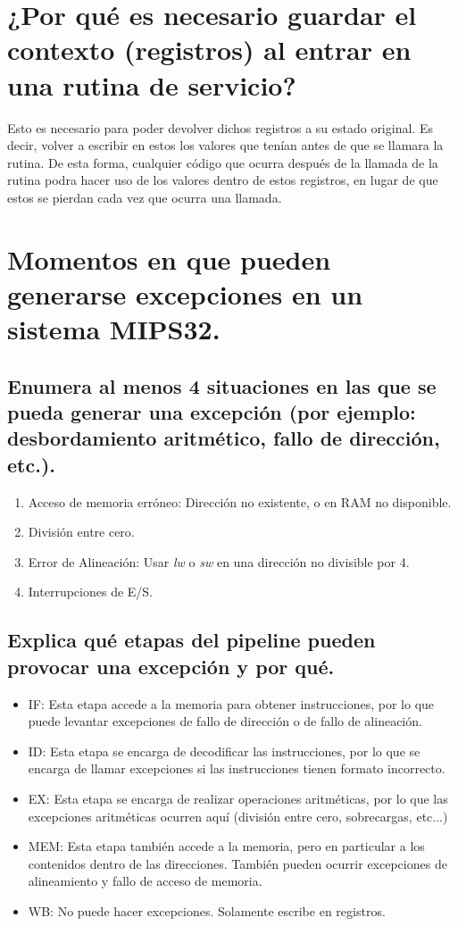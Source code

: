 \documentclass[titlepage]{article}
\begin{document}
\section*{¿Por qué es necesario guardar el contexto (registros) al entrar en una rutina de servicio?}

Esto es necesario para poder devolver dichos registros a su estado original. Es decir, volver a escribir en estos los valores que tenían antes de que se llamara la rutina. De esta forma, cualquier código que ocurra después de la llamada de la rutina podra hacer uso de los valores dentro de estos registros, en lugar de que estos se pierdan cada vez que ocurra una llamada.

\section*{Momentos en que pueden generarse excepciones en un sistema MIPS32.}

\subsection*{Enumera al menos 4 situaciones en las que se pueda generar una excepción (por ejemplo: desbordamiento aritmético, fallo de dirección, etc.).}

\begin{enumerate}
    \item Acceso de memoria erróneo: Dirección no existente, o en RAM no disponible.
    \item División entre cero.
    \item Error de Alineación: Usar \emph{lw} o \emph{sw} en una dirección no divisible por 4.
    \item Interrupciones de E/S.
\end{enumerate}

\subsection*{Explica qué etapas del pipeline pueden provocar una excepción y por qué.}

\begin{itemize}
    \item IF: Esta etapa accede a la memoria para obtener instrucciones, por lo que puede levantar excepciones de fallo de dirección o de fallo de alineación.
    \item ID: Esta etapa se encarga de decodificar las instrucciones, por lo que se encarga de llamar excepciones si las instrucciones tienen formato incorrecto.
    \item EX: Esta etapa se encarga de realizar operaciones aritméticas, por lo que las excepciones aritméticas ocurren aquí (división entre cero, sobrecargas, etc...)
    \item MEM: Esta etapa también accede a la memoria, pero en particular a los contenidos dentro de las direcciones. También pueden ocurrir excepciones de alineamiento y fallo de acceso de memoria.
    \item WB: No puede hacer excepciones. Solamente escribe en registros.
\end{itemize}
\end{document}

